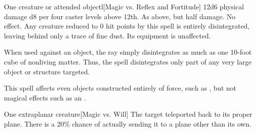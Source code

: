 \begin{spellheader}
    \spellrng{\rngclose}
\end{spellheader}
\begin{spelleffects}
    \begin{spelltarget}{One creature or attended object}l[Magic vs. Reflex and Fortitude]
        \spellsuccess 12d6 physical damage \add d8 per four caster levels above 12th.
        \spellfailure[Fortitude] As above, but half damage.
        \spellfailure[Reflex] No effect.
        \spelleffect Any creature reduced to 0 hit points by this spell is entirely disintegrated, leaving behind only a trace of fine dust. Its equipment is unaffected.
        \par When used against an object, the ray simply disintegrates as much as one 10-foot cube of nonliving matter. Thus, the spell disintegrates only part of any very large object or structure targeted.
    \end{spelltarget}
\end{spelleffects}
\begin{spellfooter}
    \spellnotes This spell affects even objects constructed entirely of force, such as , but not magical effects such as an .
\end{spellfooter}

\begin{spellheader}
    \spellrng{\rngclose}
\end{spellheader}
\begin{spelleffects}
    \begin{spelltarget}{One extraplanar creature}[Magic vs. Will]
        \spellsuccess The target teleported back to its proper plane. There is a 20\% chance of actually sending it to a plane other than its own.
    \end{spelltarget}
\end{spelleffects}
\begin{spellfooter}
    
\end{spellfooter}

